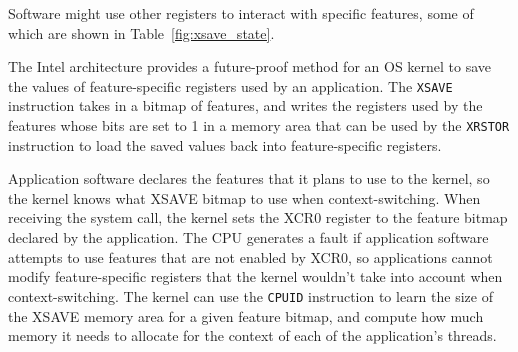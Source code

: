 
Software might use other registers to interact with specific features, some of
which are shown in Table~\ref{fig:xsave_state}.

\begin{table}[hbt]
  \caption{Sample feature-specific Intel architecture registers.}
  \label{fig:xsave_state}
\end{table}

The Intel architecture provides a future-proof method for an OS kernel to save
the values of feature-specific registers used by an application. The
\texttt{XSAVE} instruction takes in a bitmap of features, and writes the
registers used by the features whose bits are set to 1 in a memory area that
can be used by the \texttt{XRSTOR} instruction to load the saved values back
into feature-specific registers.

Application software declares the features that it plans to use to the kernel,
so the kernel knows what XSAVE bitmap to use when context-switching. When
receiving the system call, the kernel sets the XCR0 register to the feature
bitmap declared by the application. The CPU generates a fault if application
software attempts to use features that are not enabled by XCR0, so applications
cannot modify feature-specific registers that the kernel wouldn't take into
account when context-switching. The kernel can use the \texttt{CPUID}
instruction to learn the size of the XSAVE memory area for a given feature
bitmap, and compute how much memory it needs to allocate for the context of
each of the application's threads.

